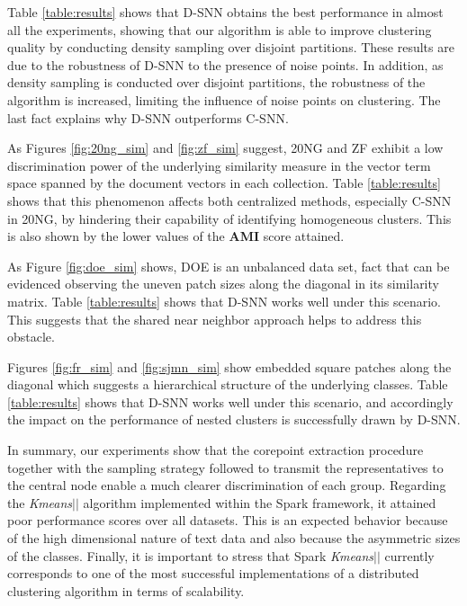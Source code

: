 \documentclass[preprint,12pt,authoryear,review]{elsarticle}
\begin{document}
\noindent Table \ref{table:results} shows that D-SNN obtains the best performance in almost all the experiments, showing that our algorithm is able to improve clustering quality by conducting density sampling over disjoint partitions. These results are due to the robustness of D-SNN to the presence of noise points. In addition, as density sampling is conducted over disjoint partitions, the robustness of the algorithm is increased, limiting the influence of noise points on clustering. The last fact explains why D-SNN outperforms C-SNN.    


As Figures \ref{fig:20ng_sim} and \ref{fig:zf_sim} suggest, 20NG and ZF exhibit a low discrimination power of the underlying similarity measure in the vector term space spanned by the document vectors in each collection. Table \ref{table:results} shows that this phenomenon affects both centralized methods, especially C-SNN in 20NG, by hindering their capability of identifying homogeneous clusters. This is also shown by the lower values of the \textbf{AMI} score attained.

As Figure \ref{fig:doe_sim} shows, DOE is an unbalanced data set, fact that can be evidenced observing the uneven patch sizes along the diagonal in its similarity matrix. 
Table \ref{table:results} shows that D-SNN works well under this scenario. 
This suggests that the shared near neighbor approach helps to address this obstacle.

Figures \ref{fig:fr_sim} and \ref{fig:sjmn_sim} show embedded square patches along the diagonal which suggests a hierarchical structure of the underlying classes. 
Table \ref{table:results} shows that D-SNN works well under this scenario, and accordingly the impact on the performance of nested clusters is successfully drawn by D-SNN.

In summary, our experiments show that the corepoint extraction procedure together with the sampling strategy followed to transmit the representatives to the central node enable a much clearer discrimination of each group. Regarding the \textit{Kmeans$||$} algorithm implemented within the Spark framework, it attained poor performance scores over all datasets. This is an expected behavior because of the high dimensional nature of text data and also because the asymmetric sizes of the classes. Finally, it is important to stress that Spark \textit{Kmeans$||$} currently corresponds to one of the most successful implementations of a distributed clustering algorithm in terms of scalability.
\end{document}
